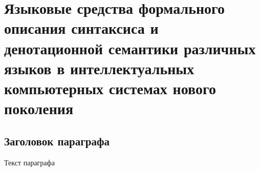 
\chapter{Языковые средства формального описания синтаксиса и денотационной семантики различных языков в интеллектуальных компьютерных системах нового поколения}
\label{chapter_lang}


\section{Заголовок параграфа}
Текст параграфа

%